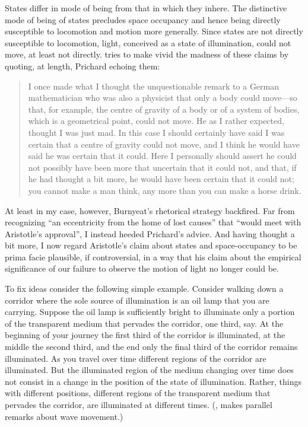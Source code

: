States differ in mode of being from that in which they inhere. The distinctive mode of being of states precludes space occupancy and hence being directly susceptible to locomotion and motion more generally. Since states are not directly susceptible to locomotion, light, conceived as a state of illumination, could not move, at least not directly. \citet[430 n29; appendix]{Burnyeat:1995fk} tries to make vivid the madness of these claims by quoting, at length, Prichard echoing them:
\begin{quote}
	I once made what I thought the unquestionable remark to a German mathematician who was also a physicist that only a body could move---so that, for example, the centre of gravity of a body or of a system of bodies, which is a geometrical point, could not move. He as I rather expected, thought I was just mad. In this case I should certainly have said I was certain that a centre of gravity could not move, and I think he would have said he was certain that it could. Here I personally should assert he could not possibly have been more that uncertain that it could not, and that, if he had thought a bit more, he would have been certain that it could not; you cannot make a man think, any more than you can make a horse drink. \citep[99; this is just the initial paragraph of the material that Burnyeat quotes]{Prichard:1950tg}
\end{quote}
At least in my case, however, Burnyeat's \citeyearpar[430 n29]{Burnyeat:1995fk} rhetorical strategy backfired. Far from recognizing ``an eccentricity from the home of lost causes'' that ``would meet with Aristotle's approval'', I instead heeded Prichard's advice. And having thought a bit more, I now regard Aristotle's claim about states and space-occupancy to be prima facie plausible, if controversial, in a way that his claim about the empirical significance of our failure to observe the motion of light no longer could be.

To fix ideas consider the following simple example. Consider walking down a corridor where the sole source of illumination is an oil lamp that you are carrying. Suppose the oil lamp is sufficiently bright to illuminate only a portion of the transparent medium that pervades the corridor, one third, say. At the beginning of your journey the first third of the corridor is illuminated, at the middle the second third, and the end only the final third of the corridor remains illuminated. As you travel over time different regions of the corridor are illuminated. But the illuminated region of the medium changing over time does not consist in a change in the position of the state of illumination. Rather, things with different positions, different regions of the transparent medium that pervades the corridor, are illuminated at different times. (\citealt[99]{Prichard:1950tg}, makes parallel remarks about wave movement.)

